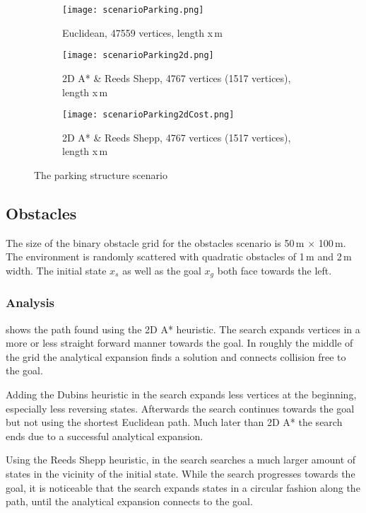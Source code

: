 \begin{figure}[h]
    \centering
    \begin{subfigure}[t]{\textwidth}
    \texttt{[image: scenarioParking.png]}
        \caption{Euclidean, 47559 vertices, length x\,m}
    \label{fig:scenarioParkingEuclidean}
    \end{subfigure}
    \begin{subfigure}[t]{\textwidth}
    \texttt{[image: scenarioParking2d.png]}
        \caption{2D A* \& Reeds Shepp, 4767 vertices (1517 vertices), length x\,m}
    \label{fig:scenarioParking2D}
    \end{subfigure}    
    \begin{subfigure}[t]{\textwidth}
    \texttt{[image: scenarioParking2dCost.png]}
        \caption{2D A* \& Reeds Shepp, 4767 vertices (1517 vertices), length x\,m}
    \label{fig:scenarioParking2dCost}
    \end{subfigure}
    \caption{The parking structure scenario}
    \label{fig:scenarioParking}
\end{figure}

\subsection{Obstacles}
The size of the binary obstacle grid for the obstacles scenario is 50\,m $\times$ 100\,m. The environment is randomly scattered with quadratic obstacles of 1\,m and 2\,m width. The initial state $x_s$ as well as the goal $x_g$ both face towards the left.

\subsubsection{Analysis}
 shows the path found using the 2D A* heuristic. The search expands vertices in a more or less straight forward manner towards the goal. In roughly the middle of the grid the analytical expansion finds a solution and connects collision free to the goal.

Adding the Dubins heuristic in  the search expands less vertices at the beginning, especially less reversing states. Afterwards the search continues towards the goal but not using the shortest Euclidean path. Much later than 2D A* the search ends due to a successful analytical expansion.

Using the Reeds Shepp heuristic, in  the search searches a much larger amount of states in the vicinity of the initial state. While the search progresses towards the goal, it is noticeable that the search expands states in a circular fashion along the path, until the analytical expansion connects to the goal.

